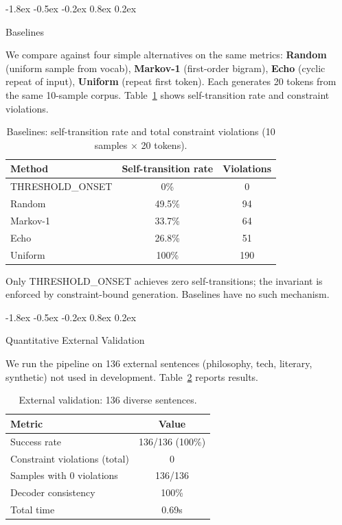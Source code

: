 \documentclass[10pt]{article}
\makeatletter
\renewcommand{\subsection}{\@startsection{subsection}{2}{\z@}%
  {-1.8ex \@plus -0.5ex \@minus -0.2ex}%
  {0.8ex \@plus 0.2ex}%
  {\normalsize\bfseries\raggedright}}
\makeatother
\begin{document}
\subsection{Baselines}

We compare against four simple alternatives on the same metrics: \textbf{Random}
(uniform sample from vocab), \textbf{Markov-1} (first-order bigram), \textbf{Echo}
(cyclic repeat of input), \textbf{Uniform} (repeat first token). Each generates
20 tokens from the same 10-sample corpus. Table~\ref{tab:baselines} shows
self-transition rate and constraint violations.

\begin{table}[t]
\centering
\caption{Baselines: self-transition rate and total constraint violations
(10 samples $\times$ 20 tokens).}
\label{tab:baselines}
\begin{tabular}{lcc}
\toprule
\textbf{Method} & \textbf{Self-transition rate} & \textbf{Violations} \\
\midrule
THRESHOLD\_ONSET & 0\% & 0 \\
Random & 49.5\% & 94 \\
Markov-1 & 33.7\% & 64 \\
Echo & 26.8\% & 51 \\
Uniform & 100\% & 190 \\
\bottomrule
\end{tabular}
\end{table}

Only THRESHOLD\_ONSET achieves zero self-transitions; the invariant is enforced by
constraint-bound generation. Baselines have no such mechanism.

\subsection{Quantitative External Validation}

We run the pipeline on 136 external sentences (philosophy, tech, literary, synthetic)
not used in development. Table~\ref{tab:external} reports results.

\begin{table}[t]
\centering
\caption{External validation: 136 diverse sentences.}
\label{tab:external}
\begin{tabular}{lc}
\toprule
\textbf{Metric} & \textbf{Value} \\
\midrule
Success rate & 136/136 (100\%) \\
Constraint violations (total) & 0 \\
Samples with 0 violations & 136/136 \\
Decoder consistency & 100\% \\
Total time & 0.69s \\
\bottomrule
\end{tabular}
\end{table}
\end{document}
